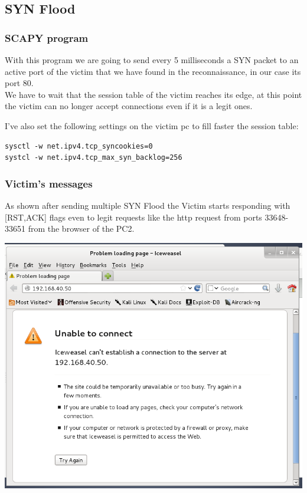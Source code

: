 \subsection{SYN Flood}
\subsubsection{SCAPY program}

With this program we are going to send every 5 milliseconds a SYN packet to an active port of the victim that we have found in the reconnaissance, in our case its port 80. \\
We have to wait that the session table of the victim reaches its edge, at this point the victim can no longer accept connections even if it is a legit ones.\par
I’ve also set the following settings on the victim pc to fill faster the session table:\\
\begin{lstlisting}
sysctl -w net.ipv4.tcp_syncookies=0
systcl -w net.ipv4.tcp_max_syn_backlog=256
\end{lstlisting}

\subsubsection{Victim's messages}



As shown after sending multiple SYN Flood the Victim starts responding with [RST,ACK] flags even to legit requests like the http request from ports 33648-33651 from the browser of the PC2.\par
\medskip
\includegraphics[width=16cm]{img/SYNFloodResult.png}\par


